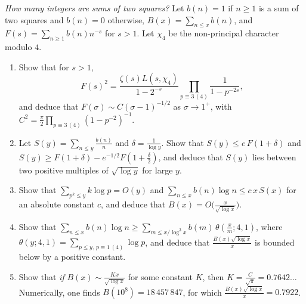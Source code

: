 \begin{exercise}[Journey]\label{pb:twosquares}
\emph{How many integers are sums of two squares?} Let $b(n)=1$ if $n\ge1$ is a sum of two squares and $b(n)=0$ otherwise, $B(x)=\sum_{n\le x}b(n)$, and
$F(s)=\sum_{n\ge1}b(n)n^{-s}$ for $s>1$. Let $\chi_4$ be the non-principal character modulo $4$.
\begin{enumerate}[label=(\alph*)]
\item Show that for $s>1$,
\[
F(s)^2=\frac{\zeta(s)L(s,\chi_4)}{1-2^{-s}}\prod_{p\equiv3\,(4)}\frac1{1-p^{-2s}},
\]
and deduce that $F(\sigma)\sim C(\sigma-1)^{-1/2}$ as $\sigma\to1^+$, with $C^2=\frac\pi2\prod_{p\equiv3\,(4)}(1-p^{-2})^{-1}$.
\item Let $S(y)=\sum_{n\le y}\frac{b(n)}n$ and $\delta=\frac1{\log y}$. Show that $S(y)\le e\,F(1+\delta)$ and $S(y)\ge F(1+\delta)-e^{-1/2}F(1+\frac\delta2)$, and
deduce that $S(y)$ lies between two positive multiples of $\sqrt{\log y}$ for large $y$.
\item Show that $\sum_{p^k\le y}k\log p=O(y)$ and $\sum_{n\le x}b(n)\log n\le c\,x\,S(x)$ for an absolute constant $c$, and deduce that $B(x)=O\bigl(\frac x{\sqrt{\log x}}\bigr)$.
\item Show that $\sum_{n\le x}b(n)\log n\ge\sum_{m\le x/\log^3x}b(m)\,\theta(\frac xm;4,1)$, where $\theta(y;4,1)=\sum_{p\le y,\,p\equiv1\,(4)}\log p$, and
deduce that $\frac{B(x)\sqrt{\log x}}x$ is bounded below by a positive constant.
\item Show that \emph{if} $B(x)\sim\frac{Kx}{\sqrt{\log x}}$ for some constant $K$, then $K=\frac C{\sqrt\pi}=0.7642\ldots$ Numerically, one finds $B(10^8)=18\,457\,847$, for which
$\frac{B(x)\sqrt{\log x}}x=0.7922$.
\end{enumerate}
\end{exercise}

